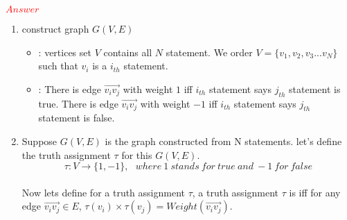 \documentclass[11pt,twoside]{article}
\begin{document}
\begin{enumerate}[leftmargin=0pt]
\begin{enumerate}[label=(\alph*),topsep=\parsep]
	\end{enumerate}
	\textcolor{red} {$Answer$}
	\begin{enumerate}[topsep=\parsep]
	\item construct  graph $G(V,E)$
		\begin{itemize}[label = {}]
		\item {}: vertices set $V$ contains all $N$ statement. We order $V= \{v_1, v_2, v_3 ... v_N \}$ such that $v_i$ is a $i_{th}$ statement.
		\item  {}: There is edge $\vec{v_iv_j}$ with weight $1$ iff $i_{th}$ statement says $j_{th}$ statement
		is true.  There is edge $\vec{v_iv_j}$ with weight $-1$ iff $i_{th}$ statement says $j_{th}$ statement
		is false. 
		\end{itemize}
	\item  
	Suppose $G(V,E)$ is the graph constructed from  N statements. let's define the truth assignment $\tau$ for this $G(V,E)$.
	\[ \tau:  V \rightarrow \{1, -1\}, \ \ \ where \ 1 \ stands \ for \ true \ and \ -1 \ for \ false\]
	\\
	Now lets define  for a truth assignment $\tau$, a truth assignment $\tau$ is  iff for any edge $\vec{v_iv_j} \in E$,
	 $\tau(v_i) \times \tau(v_j) = Weight(\vec{v_iv_j} )$. \\
	 \\
	 

\end{enumerate}
\end{enumerate}
\end{document}
